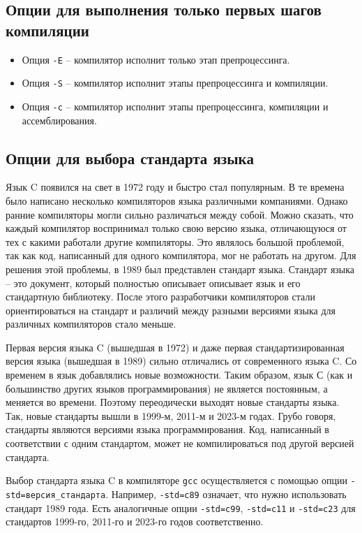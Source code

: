 \documentclass{article}
\begin{document}
\subsection*{Опции для выполнения только первых шагов компиляции}
\begin{itemize}
\item Опция \texttt{-E} -- компилятор исполнит только этап препроцессинга.
\item Опция \texttt{-S} -- компилятор исполнит этапы препроцессинга и компиляции.
\item Опция \texttt{-c} -- компилятор исполнит этапы препроцессинга, компиляции и ассемблирования.
\end{itemize}


\subsection*{Опции для выбора стандарта языка}
Язык C появился на свет в 1972 году и быстро стал популярным. В те времена было написано несколько компиляторов языка различными компаниями. Однако ранние компиляторы могли сильно различаться между собой. Можно сказать, что каждый компилятор воспринимал только свою версию языка, отличающуюся от тех с какими работали другие компиляторы. Это являлось большой проблемой, так как код, написанный для одного компилятора, мог не работать на другом. Для решения этой проблемы, в 1989 был представлен стандарт языка. Стандарт языка -- это документ, который полностью описывает описывает язык и его стандартную библиотеку. После этого разработчики компиляторов стали ориентироваться на стандарт и различий между разными версиями языка для различных компиляторов стало меньше.

Первая версия языка C (вышедшая в 1972) и даже первая стандартизированная версия языка (вышедшая в 1989) сильно отличались от современного языка C. Со временем в язык добавлялись новые возможности. Таким образом, язык С (как и большинство других языков программирования) не является постоянным, а меняется во времени. Поэтому переодически выходят новые стандарты языка. Так, новые стандарты вышли в 1999-м, 2011-м и 2023-м годах. Грубо говоря, стандарты являются версиями языка программирования. Код, написанный в соответствии с одним стандартом, может не компилироваться под другой версией стандарта.

Выбор стандарта языка C в компиляторе \texttt{gcc} осуществляется с помощью опции \texttt{-std=версия\_стандарта}. Например, \texttt{-std=c89} означает, что нужно использовать стандарт 1989 года. Есть аналогичные опции \texttt{-std=c99}, \texttt{-std=c11} и \texttt{-std=c23} для стандартов 1999-го, 2011-го и 2023-го годов соответственно.
\end{document}
